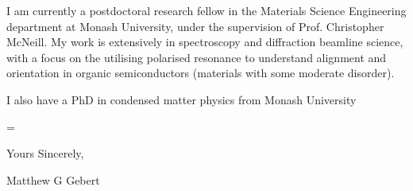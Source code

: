 \documentclass[10pt,a4paper,ragged2e,withhyper,paragraphstrue]{altacv}
\newcommand{\textalignment}{
	\justifying
    \tolerance=1 %
    \emergencystretch=\maxdimen
    \hyphenpenalty=10000 
    \hbadness=10000
}
\newcommand{\pind}{\hspace{24pt}}
\begin{document}
    \pind I am currently a postdoctoral research fellow in the Materials Science Engineering department at Monash University, under the supervision of Prof. Christopher McNeill. My work is extensively in spectroscopy and diffraction beamline science, with a focus on the utilising polarised resonance to understand alignment and orientation in organic semiconductors (materials with some moderate disorder). 
    
    I also have a PhD in condensed matter physics from Monash University

	


    {\color{emphasis}
    \textalignment

		
    \vspace{1em}

    Yours Sincerely, \newline

    {\color{emphasis}Matthew G Gebert}

    }
    
    \divider
\end{document}
